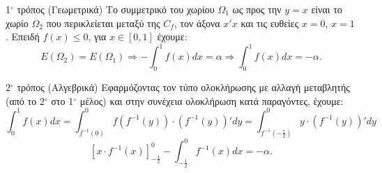 \begin{alist}
\begin{rlist}
        1$^{\circ}$ τρόπος (Γεωμετρικά)
        Το συμμετρικό του χωρίου $\Omega_1$ ως προς την $y=x$ είναι το χωρίο $\Omega_2$ που
        περικλείεται μεταξύ της $C_f$, τον άξονα $x'x$ και τις ευθείες $x=0$, $x=1$. Επειδή
        $f(x)\le 0$, για $x\in[0,1]$ έχουμε:
        \[ E(\Omega_2) = E(\Omega_1) \Rightarrow -\int_{0}^{1}f(x)dx = \alpha \Rightarrow \int_{0}^{1}f(x)dx = -\alpha . \]

        2$^{\circ}$ τρόπος (Αλγεβρικά)
        Εφαρμόζοντας τον τύπο ολοκλήρωσης με αλλαγή μεταβλητής (από το 2$^{\circ}$ στο 1$^{\circ}$
        μέλος) και στην συνέχεια ολοκλήρωση κατά παραγόντες, έχουμε:
        \[ \int_{0}^{1}f(x)dx = \int_{f^{-1}(0)}^{0}f(f^{-1}(y))\cdot (f^{-1}(y))'dy = \int_{f^{-1}(-\frac{1}{2})}^{0}y\cdot (f^{-1}(y))'dy \]
        \[ [x \cdot f^{-1}(x)]_{-\frac{1}{2}}^{0} - \int_{-\frac{1}{2}}^{0} f^{-1}(x) dx = -\alpha . \] 
    \end{rlist}
\end{alist}
